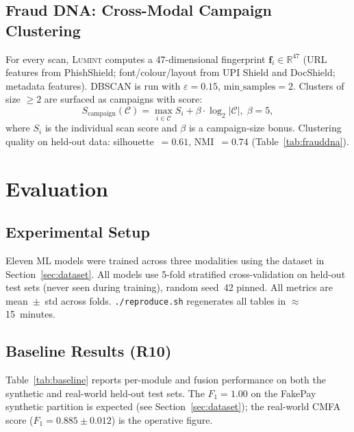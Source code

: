 \documentclass[conference]{IEEEtran}
\begin{document}
\subsection{Fraud DNA: Cross-Modal Campaign Clustering}
For every scan, \textsc{Lumint} computes a 47-dimensional fingerprint
$\mathbf{f}_i\!\in\!\mathbb{R}^{47}$ (URL features from PhishShield;
font/colour/layout from UPI Shield and DocShield; metadata features).
DBSCAN is run with $\varepsilon{=}0.15$, $\mathrm{min\_samples}{=}2$.
Clusters of size ${\geq}2$ are surfaced as campaigns with score:
\begin{equation}
S_{\text{campaign}}(\mathcal{C}) =
  \max_{i\in\mathcal{C}} S_i + \beta\cdot\log_2|\mathcal{C}|,\;
  \beta{=}5,
\label{eq:campaign}
\end{equation}
where $S_i$ is the individual scan score and $\beta$ is a
campaign-size bonus.
Clustering quality on held-out data:
silhouette~$=0.61$, NMI~$=0.74$ (Table~\ref{tab:frauddna}).

\section{Evaluation}\label{sec:evaluation}

\subsection{Experimental Setup}
Eleven ML models were trained across three modalities using the dataset
in Section~\ref{sec:dataset}.
All models use 5-fold stratified cross-validation on held-out test sets
(never seen during training), random seed~42 pinned.
All metrics are mean~$\pm$~std across folds.
\texttt{./reproduce.sh} regenerates all tables in $\approx$15~minutes.

\subsection{Baseline Results (R10)}
Table~\ref{tab:baseline} reports per-module and fusion performance on
both the synthetic and real-world held-out test sets.
The $F_1{=}1.00$ on the FakePay synthetic partition is expected (see
Section~\ref{sec:dataset}); the real-world CMFA score
($F_1{=}0.885{\pm}0.012$) is the operative figure.
\end{document}
